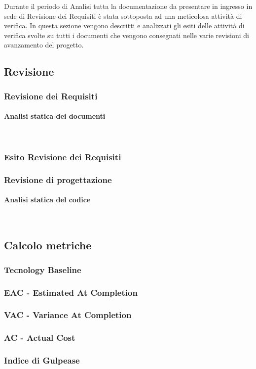 Durante il periodo di Analisi tutta la documentazione da presentare in ingresso in sede di 
Revisione dei Requisiti è stata sottoposta ad una meticolosa attività di verifica. 
In questa sezione vengono descritti e analizzati gli esiti delle attività di verifica svolte su tutti i documenti che 
vengono consegnati nelle varie revisioni di avanzamento del progetto.

\subsection{Revisione}
\subsubsection{Revisione dei Requisiti}
\paragraph{Analisi statica dei documenti}\mbox{}\\


\subsubsection{Esito Revisione dei Requisiti}



\subsubsection{Revisione di progettazione}
\paragraph{Analisi statica del codice}\mbox{}\\



\subsection{Calcolo metriche}
\subsubsection{Tecnology Baseline}


\subsubsection{EAC - Estimated At Completion}


\subsubsection{VAC - Variance At Completion}


\subsubsection{AC - Actual Cost}


\subsubsection{Indice di Gulpease}



